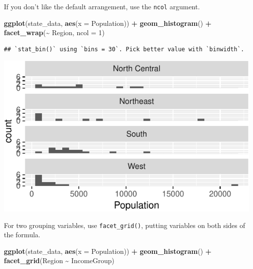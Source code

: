 \documentclass[
  12pt,
  oneside,openany]{book}
\newenvironment{Shaded}{\begin{snugshade}}{\end{snugshade}}
\newcommand{\DataTypeTok}[1]{\textcolor[rgb]{0.13,0.29,0.53}{#1}}
\newcommand{\DecValTok}[1]{\textcolor[rgb]{0.00,0.00,0.81}{#1}}
\newcommand{\KeywordTok}[1]{\textcolor[rgb]{0.13,0.29,0.53}{\textbf{#1}}}
\newcommand{\NormalTok}[1]{#1}
\newcommand{\OperatorTok}[1]{\textcolor[rgb]{0.81,0.36,0.00}{\textbf{#1}}}
\newcommand{\StringTok}[1]{\textcolor[rgb]{0.31,0.60,0.02}{#1}}
\begin{document}
If you don't like the default arrangement, use the \texttt{ncol} argument.

\begin{Shaded}
\begin{Highlighting}[]
\KeywordTok{ggplot}\NormalTok{(state\_data, }\KeywordTok{aes}\NormalTok{(}\DataTypeTok{x =}\NormalTok{ Population)) }\OperatorTok{+}
\StringTok{  }\KeywordTok{geom\_histogram}\NormalTok{() }\OperatorTok{+}
\StringTok{  }\KeywordTok{facet\_wrap}\NormalTok{(}\OperatorTok{\textasciitilde{}}\StringTok{ }\NormalTok{Region, }\DataTypeTok{ncol =} \DecValTok{1}\NormalTok{)}
\end{Highlighting}
\end{Shaded}

\begin{verbatim}
## `stat_bin()` using `bins = 30`. Pick better value with `binwidth`.
\end{verbatim}

\includegraphics{pdaps_files/figure-latex/facet-wrap-ncol-1.pdf}

For two grouping variables, use \texttt{facet\_grid()}, putting variables on both sides of the formula.

\begin{Shaded}
\begin{Highlighting}[]
\KeywordTok{ggplot}\NormalTok{(state\_data, }\KeywordTok{aes}\NormalTok{(}\DataTypeTok{x =}\NormalTok{ Population)) }\OperatorTok{+}
\StringTok{  }\KeywordTok{geom\_histogram}\NormalTok{() }\OperatorTok{+}
\StringTok{  }\KeywordTok{facet\_grid}\NormalTok{(Region }\OperatorTok{\textasciitilde{}}\StringTok{ }\NormalTok{IncomeGroup)}
\end{Highlighting}
\end{Shaded}
\end{document}
